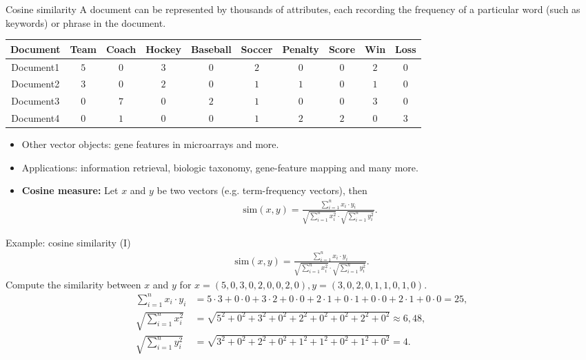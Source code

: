 \documentclass[aspectratio=169,t]{beamer}
\begin{document}
  { 
    \begin{frame}{Cosine similarity}
    A document can be represented by thousands of attributes, each recording the frequency of a particular word (such as keywords) or phrase in the document.\\[0.2cm]
    \begin{tabular}{|c|c|c|c|c|c|c|c|c|c|}
    \hline
    Document & Team & Coach & Hockey & Baseball & Soccer & Penalty & Score & Win & Loss \\\hline
    Document1 & $5$ & $0$ & $3$ & $0$ & $2$ & $0$ & $0$ & $2$ & $0$ \\
    Document2 & $3$ & $0$ & $2$ & $0$ & $1$ & $1$ & $0$ & $1$ & $0$ \\
    Document3 & $0$ & $7$ & $0$ & $2$ & $1$ & $0$ & $0$ & $3$ & $0$ \\
    Document4 & $0$ & $1$ & $0$ & $0$ & $1$ & $2$ & $2$ & $0$ & $3$ \\
    \hline
    \end{tabular}
    \begin{itemize}
      \item Other vector objects: gene features in microarrays and more.
      \item Applications: information retrieval, biologic taxonomy, gene-feature mapping and many more.
      \item \textbf{Cosine measure:} Let $x$ and $y$ be two vectors (e.g. term-frequency vectors), then
      \begin{align}
        \text{sim}(x,y) = \frac{\sum_{i=1}^{n} x_i \cdot y_i}{\sqrt{\sum_{i=1}^{n}x_i^2}\cdot \sqrt{\sum_{i=1}^{n} y_i^2}}.
      \end{align}
    \end{itemize}
    \end{frame}
  }

  { 
    \begin{frame}{Example: cosine similarity (I)}
    \begin{align}
      \text{sim}(x,y) = \frac{\sum_{i=1}^{n} x_i \cdot y_i}{\sqrt{\sum_{i=1}^{n}x_i^2}\cdot \sqrt{\sum_{i=1}^{n} y_i^2}}.
    \end{align}
    Compute the similarity between $x$ and $y$ for $x = (5,0,3,0,2,0,0,2,0), y = (3,0,2,0,1,1,0,1,0).$
    \begin{align}
      \sum_{i=1}^{n} x_i \cdot y_i &= 5 \cdot 3 + 0 \cdot 0 + 3 \cdot 2 + 0 \cdot 0 + 2 \cdot 1 + 0 \cdot 1 + 0 \cdot 0 + 2 \cdot 1 + 0 \cdot 0 = 25,\\
      \sqrt{\sum_{i=1}^{n}x_i^2} &= \sqrt{5^2 + 0^2 + 3^2 + 0^2 + 2^2 + 0^2 + 0^2 + 2^2 + 0^2} \approx 6,48,\\
      \sqrt{\sum_{i=1}^{n}y_i^2} &= \sqrt{3^2 + 0^2 + 2^2 + 0^2 + 1^2 + 1^2 + 0^2 + 1^2 + 0^2} = 4.\\
    \end{align}
    \end{frame}
  }
\end{document}
